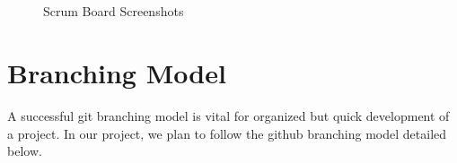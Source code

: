 \documentclass{scrreprt}
\begin{document}
\begin{figure}[ht!]
     \begin{center}
%
        \\%
        \\%
    \end{center}
    \caption{%
        Scrum Board Screenshots
     }%
   \label{fig:subfigures}
\end{figure}

\pagebreak

\section{Branching Model}

A successful git branching model is vital for organized but quick development of a project. In our project, we plan to follow the github branching model detailed below.
\end{document}
